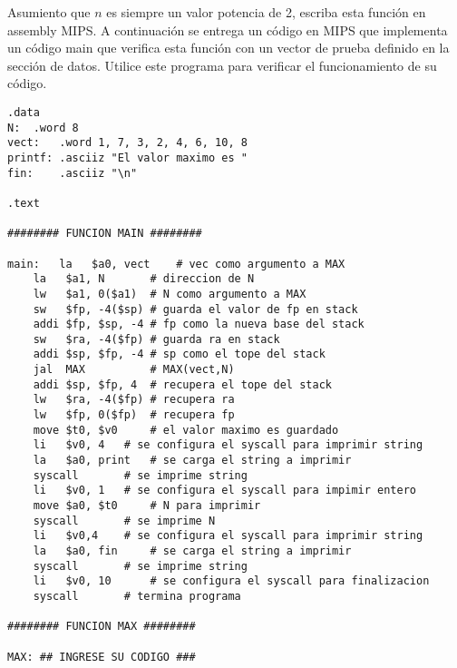 \documentclass[letterpaper,11pt,notitlepage]{article}
\begin{document}
Asumiento que $n$ es siempre un valor potencia de 2, escriba esta función en assembly MIPS.
A continuación se entrega un código en MIPS que implementa un código main que verifica esta función con un vector de prueba definido en la sección de datos. Utilice este programa para verificar el funcionamiento de su código.

\begin{lstlisting}[style=C]
.data				
N:	.word 8				
vect:	.word 1, 7, 3, 2, 4, 6, 10, 8	
printf: .asciiz "El valor maximo es "	
fin:	.asciiz "\n"

.text

######## FUNCION MAIN ########

main:	la   $a0, vect    # vec como argumento a MAX	
	la   $a1, N       # direccion de N
	lw   $a1, 0($a1)  # N como argumento a MAX
	sw   $fp, -4($sp) # guarda el valor de fp en stack
	addi $fp, $sp, -4 # fp como la nueva base del stack
	sw   $ra, -4($fp) # guarda ra en stack
	addi $sp, $fp, -4 # sp como el tope del stack
	jal  MAX          # MAX(vect,N)
	addi $sp, $fp, 4  # recupera el tope del stack
	lw   $ra, -4($fp) # recupera ra
	lw   $fp, 0($fp)  # recupera fp
	move $t0, $v0	  # el valor maximo es guardado
	li   $v0, 4	  # se configura el syscall para imprimir string
	la   $a0, print	  # se carga el string a imprimir
	syscall		  # se imprime string
	li   $v0, 1	  # se configura el syscall para impimir entero
	move $a0, $t0	  # N para imprimir
	syscall		  # se imprime N
	li   $v0,4	  # se configura el syscall para imprimir string
	la   $a0, fin	  # se carga el string a imprimir
	syscall		  # se imprime string
	li   $v0, 10	  # se configura el syscall para finalizacion
	syscall		  # termina programa
		
######## FUNCION MAX ########

MAX: ## INGRESE SU CODIGO ###
\end{lstlisting} 
%
\newpage
\end{document}

